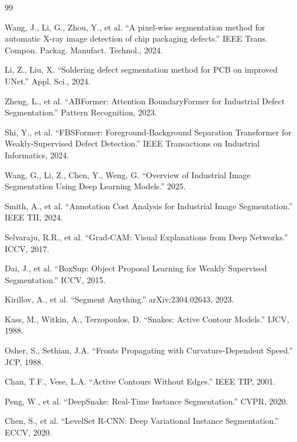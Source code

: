 \documentclass[12pt, a4paper]{article}
\begin{document}

\begin{thebibliography}{99}

Wang, J., Li, G., Zhou, Y., et al. ``A pixel-wise segmentation method for automatic X-ray image detection of chip packaging defects.'' IEEE Trans. Compon. Packag. Manufact. Technol., 2024.

Li, Z., Liu, X. ``Soldering defect segmentation method for PCB on improved UNet.'' Appl. Sci., 2024.

Zheng, L., et al. ``ABFormer: Attention BoundaryFormer for Industrial Defect Segmentation.'' Pattern Recognition, 2023.

Shi, Y., et al. ``FBSFormer: Foreground-Background Separation Transformer for Weakly-Supervised Defect Detection.'' IEEE Transactions on Industrial Informatics, 2024.

Wang, G., Li, Z., Chen, Y., Weng, G. ``Overview of Industrial Image Segmentation Using Deep Learning Models.'' 2025.

Smith, A., et al. ``Annotation Cost Analysis for Industrial Image Segmentation.'' IEEE TII, 2024.

Selvaraju, R.R., et al. ``Grad-CAM: Visual Explanations from Deep Networks.'' ICCV, 2017.

Dai, J., et al. ``BoxSup: Object Proposal Learning for Weakly Supervised Segmentation.'' ICCV, 2015.

Kirillov, A., et al. ``Segment Anything.'' arXiv:2304.02643, 2023.

Kass, M., Witkin, A., Terzopoulos, D. ``Snakes: Active Contour Models.'' IJCV, 1988.

Osher, S., Sethian, J.A. ``Fronts Propagating with Curvature-Dependent Speed.'' JCP, 1988.

Chan, T.F., Vese, L.A. ``Active Contours Without Edges.'' IEEE TIP, 2001.

Peng, W., et al. ``DeepSnake: Real-Time Instance Segmentation.'' CVPR, 2020.

Chen, S., et al. ``LevelSet R-CNN: Deep Variational Instance Segmentation.'' ECCV, 2020.


\end{thebibliography}
\end{document}
